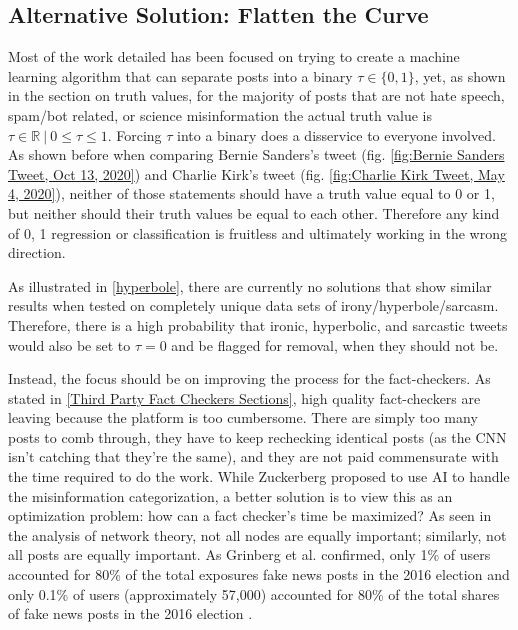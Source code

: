 \documentclass[preprint,review,12pt]{elsarticle}
\begin{document}
\subsection{Alternative Solution: Flatten the Curve}
\label{Flatten the Curve Section}
 Most of the work detailed has been focused on trying to create a machine learning algorithm that can separate posts into a binary $\tau \in \{0,1\}$, yet, as shown in the section on truth values, for the majority of posts that are not hate speech, spam/bot related, or science misinformation the actual truth value is $\tau \in \mathbb{R} \ | \ 0 \leq \tau \leq 1$. Forcing $\tau$ into a binary does a disservice to everyone involved. As shown before when comparing Bernie Sanders's tweet (fig. \ref{fig:Bernie Sanders Tweet, Oct 13, 2020}) and  Charlie Kirk's tweet (fig. \ref{fig:Charlie Kirk Tweet, May 4, 2020}), neither of those statements should have a truth value equal to 0 or 1, but neither should their truth values be equal to each other. Therefore any kind of 0, 1 regression or classification is fruitless and ultimately working in the wrong direction.
 
 As illustrated in \ref{hyperbole}, there are currently no solutions that show similar results when tested on completely unique data sets of irony/hyperbole/sarcasm. Therefore, there is a high probability that ironic, hyperbolic, and sarcastic tweets would also be set to $\tau = 0$ and be flagged for removal, when they should not be. 
 
 Instead, the focus should be on improving the process for the fact-checkers. As stated in \ref{Third Party Fact Checkers Sections}, high quality fact-checkers are leaving because the platform is too cumbersome. There are simply too many posts to comb through, they have to keep rechecking identical posts (as the CNN isn't catching that they're the same), and they are not paid commensurate with the time required to do the work. While Zuckerberg proposed to use AI to handle the misinformation categorization, a better solution is to view this as an optimization problem: how can a fact checker's time be maximized? As seen in the analysis of network theory, not all nodes are equally important; similarly, not all posts are equally important. As Grinberg et al. confirmed, only 1\% of users accounted for 80\% of the total exposures fake news posts in the 2016 election and only 0.1\% of users (approximately 57,000) accounted for 80\% of the total shares of fake news posts in the 2016 election \cite{grinberg2019fake}. 
 
\end{document}
